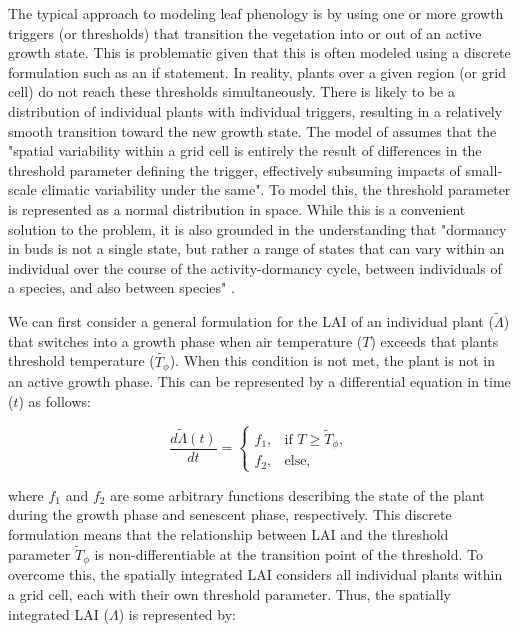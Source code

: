 \documentclass[twoside,10pt]{report}
\begin{document}
The typical approach to modeling leaf phenology is by using one or more growth triggers (or thresholds) that transition the vegetation into or out of an active growth state. This is problematic given that this is often modeled using a discrete formulation such as an if statement. In reality, plants over a given region (or grid cell) do not reach these thresholds simultaneously. There is likely to be a distribution of individual plants with individual triggers, resulting in a relatively smooth transition toward the new growth state. The model of \citet{Knorr2010} assumes that the "spatial variability within a grid cell is entirely the result of differences in the threshold parameter defining the trigger, effectively subsuming impacts of small‐scale climatic variability under the same". To model this, the threshold parameter is represented as a normal distribution in space. While this is a convenient solution to the problem, it is also grounded in the understanding that "dormancy in buds is not a single state, but rather a range of states that can vary within an individual over the course of the activity-dormancy cycle, between individuals of a species, and also between species" \citep{Cooke2012}. 

We can first consider a general formulation for the LAI of an individual plant ($\tilde{\Lambda}$) that switches into a growth phase when air temperature ($T$) exceeds that plants threshold temperature ($\tilde{T_{\phi}}$). When this condition is not met, the plant is not in an active growth phase. This can be represented by a differential equation in time ($t$) as follows:

\begin{equation}
\label{e:phenology_lai_discrete}
    \frac{d\tilde{\Lambda}(t)}{dt} = 
    \begin{cases}
    f_1,  &  \text{if }T \geq \tilde{T}_{\phi},\\
    f_2, &  \text{else, }
    \end{cases}
\end{equation}

where $f_1$ and $f_2$ are some arbitrary functions describing the state of the plant during the growth phase and senescent phase, respectively. This discrete formulation means that the relationship between LAI and the threshold parameter $\tilde{T}_{\phi}$ is non-differentiable at the transition point of the threshold. To overcome this, the spatially integrated LAI considers all individual plants within a grid cell, each with their own threshold parameter. Thus, the spatially integrated LAI ($\Lambda$) is represented by:
\end{document}
